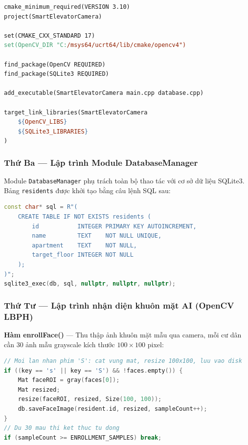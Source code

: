 \documentclass[12pt,a4paper]{article}
\begin{document}
\begin{lstlisting}[language=make, caption={Tệp CMakeLists.txt cấu hình build dự án}]
cmake_minimum_required(VERSION 3.10)
project(SmartElevatorCamera)

set(CMAKE_CXX_STANDARD 17)
set(OpenCV_DIR "C:/msys64/ucrt64/lib/cmake/opencv4")

find_package(OpenCV REQUIRED)
find_package(SQLite3 REQUIRED)

add_executable(SmartElevatorCamera main.cpp database.cpp)

target_link_libraries(SmartElevatorCamera
    ${OpenCV_LIBS}
    ${SQLite3_LIBRARIES}
)
\end{lstlisting}

\subsubsection{Thứ Ba --- Lập trình Module DatabaseManager}

Module \texttt{DatabaseManager} phụ trách toàn bộ thao tác với cơ sở dữ liệu SQLite3. Bảng \texttt{residents} được khởi tạo bằng câu lệnh SQL sau:

\begin{lstlisting}[language=C++, caption={Khởi tạo bảng cư dân trong SQLite3}]
const char* sql = R"(
    CREATE TABLE IF NOT EXISTS residents (
        id           INTEGER PRIMARY KEY AUTOINCREMENT,
        name         TEXT    NOT NULL UNIQUE,
        apartment    TEXT    NOT NULL,
        target_floor INTEGER NOT NULL
    );
)";
sqlite3_exec(db, sql, nullptr, nullptr, nullptr);
\end{lstlisting}

\subsubsection{Thứ Tư --- Lập trình nhận diện khuôn mặt AI (OpenCV LBPH)}

\textbf{Hàm enrollFace()} --- Thu thập ảnh khuôn mặt mẫu qua camera, mỗi cư dân cần 30 ảnh mẫu grayscale kích thước $100 \times 100$ pixel:

\begin{lstlisting}[language=C++, caption={Hàm enrollFace() thu thập ảnh mẫu}]
// Moi lan nhan phim 'S': cat vung mat, resize 100x100, luu vao disk
if ((key == 's' || key == 'S') && !faces.empty()) {
    Mat faceROI = gray(faces[0]);
    Mat resized;
    resize(faceROI, resized, Size(100, 100));
    db.saveFaceImage(resident.id, resized, sampleCount++);
}
// Du 30 mau thi ket thuc tu dong
if (sampleCount >= ENROLLMENT_SAMPLES) break;
\end{lstlisting}
\end{document}
